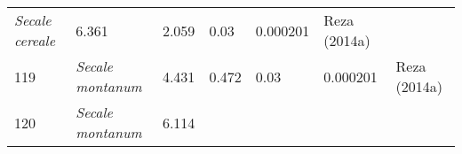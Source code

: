 \documentclass[]{article}
\begin{document}
\begin{longtable}[]{@{}lllllll@{}}
\begin{minipage}[t]{0.23\columnwidth}
\emph{Secale cereale}\strut
\end{minipage} & \begin{minipage}[t]{0.05\columnwidth}\raggedright
6.361\strut
\end{minipage} & \begin{minipage}[t]{0.08\columnwidth}\raggedright
2.059\strut
\end{minipage} & \begin{minipage}[t]{0.08\columnwidth}\raggedright
0.03\strut
\end{minipage} & \begin{minipage}[t]{0.08\columnwidth}\raggedright
0.000201\strut
\end{minipage} & \begin{minipage}[t]{0.23\columnwidth}\raggedright
Reza (2014a)\strut
\end{minipage}\tabularnewline
\begin{minipage}[t]{0.05\columnwidth}\raggedright
119\strut
\end{minipage} & \begin{minipage}[t]{0.23\columnwidth}\raggedright
\emph{Secale montanum}\strut
\end{minipage} & \begin{minipage}[t]{0.05\columnwidth}\raggedright
4.431\strut
\end{minipage} & \begin{minipage}[t]{0.08\columnwidth}\raggedright
0.472\strut
\end{minipage} & \begin{minipage}[t]{0.08\columnwidth}\raggedright
0.03\strut
\end{minipage} & \begin{minipage}[t]{0.08\columnwidth}\raggedright
0.000201\strut
\end{minipage} & \begin{minipage}[t]{0.23\columnwidth}\raggedright
Reza (2014a)\strut
\end{minipage}\tabularnewline
\begin{minipage}[t]{0.05\columnwidth}\raggedright
120\strut
\end{minipage} & \begin{minipage}[t]{0.23\columnwidth}\raggedright
\emph{Secale montanum}\strut
\end{minipage} & \begin{minipage}[t]{0.05\columnwidth}\raggedright
6.114\strut
\end{minipage} & \begin{minipage}[t]{0.08\columnwidth}\raggedright

\end{minipage}
\end{longtable}
\end{document}
